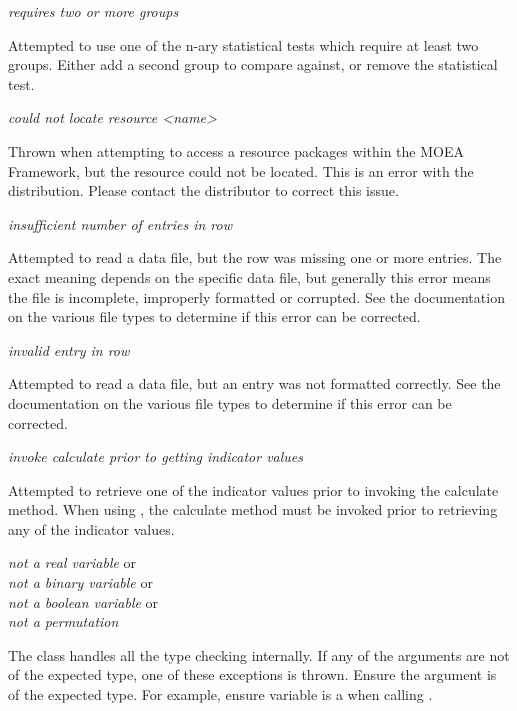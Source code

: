 \noindent
\textit{requires two or more groups}
\begin{indented}
  Attempted to use one of the n-ary statistical tests which require at least two groups.  Either add a second group to compare against, or remove the statistical test.
\end{indented}
  
\noindent
\textit{could not locate resource <name>}
\begin{indented}
  Thrown when attempting to access a resource packages within the MOEA Framework, but the resource could not be located.  This is an error with the distribution.  Please contact the distributor to correct this issue.
\end{indented}
  
\noindent
\textit{insufficient number of entries in row}
\begin{indented}
  Attempted to read a data file, but the row was missing one or more entries. The exact meaning depends on the specific data file, but generally this error means the file is incomplete, improperly formatted or corrupted.  See the documentation on the various file types to determine if this error can be corrected.
\end{indented}
  
\noindent
\textit{invalid entry in row}
\begin{indented}
  Attempted to read a data file, but an entry was not formatted correctly. See the documentation on the various file types to determine if this error can be corrected.
\end{indented}

\noindent
\textit{invoke calculate prior to getting indicator values}
\begin{indented}
  Attempted to retrieve one of the indicator values prior to invoking the calculate method.  When using , the calculate method must be invoked prior to retrieving any of the indicator values.
\end{indented}

\noindent
\textit{not a real variable} or\\
\textit{not a binary variable} or\\
\textit{not a boolean variable} or\\
\textit{not a permutation}
\begin{indented}
  The  class handles all the type checking internally.  If any of the arguments are not of the expected type, one of these exceptions is thrown.  Ensure the argument is of the expected type.  For example, ensure variable is a  when calling .
\end{indented}

